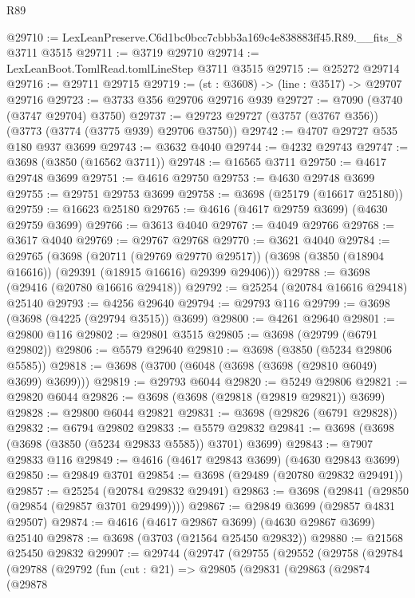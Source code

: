 \begin{lexlean}{R89}
\begin{coremodule}
@29710 := LexLeanPreserve.C6d1bc0bcc7cbbb3a169c4e838883ff45.R89.__fits_8 @3711 @3515
@29711 := @3719 @29710
@29714 := LexLeanBoot.TomlRead.tomlLineStep @3711 @3515
@29715 := @25272 @29714
@29716 := @29711 @29715
@29719 := (st : @3608) -> (line : @3517) -> @29707 @29716
@29723 := @3733 @356 @29706 @29716 @939
@29727 := @7090 (@3740 (@3747 @29704) @3750)
@29737 := @29723 @29727 (@3757 (@3767 @356)) (@3773 (@3774 (@3775 @939) @29706 @3750))
@29742 := @4707 @29727 @535 @180 @937 @3699
@29743 := @3632 @4040
@29744 := @4232 @29743
@29747 := @3698 (@3850 (@16562 @3711))
@29748 := @16565 @3711
@29750 := @4617 @29748 @3699
@29751 := @4616 @29750
@29753 := @4630 @29748 @3699
@29755 := @29751 @29753 @3699
@29758 := @3698 (@25179 (@16617 @25180))
@29759 := @16623 @25180
@29765 := @4616 (@4617 @29759 @3699) (@4630 @29759 @3699)
@29766 := @3613 @4040
@29767 := @4049 @29766
@29768 := @3617 @4040
@29769 := @29767 @29768
@29770 := @3621 @4040
@29784 := @29765
    (@3698
      (@20711 (@29769 @29770 @29517))
      (@3698 (@3850 (@18904 @16616)) (@29391 (@18915 @16616) @29399 @29406)))
@29788 := @3698 (@29416 (@20780 @16616 @29418))
@29792 := @25254 (@20784 @16616 @29418) @25140
@29793 := @4256 @29640
@29794 := @29793 @116
@29799 := @3698 (@3698 (@4225 (@29794 @3515)) @3699)
@29800 := @4261 @29640
@29801 := @29800 @116
@29802 := @29801 @3515
@29805 := @3698 (@29799 (@6791 @29802))
@29806 := @5579 @29640
@29810 := @3698 (@3850 (@5234 @29806 @5585))
@29818 := @3698 (@3700 (@6048 (@3698 (@3698 (@29810 @6049) @3699) @3699)))
@29819 := @29793 @6044
@29820 := @5249 @29806
@29821 := @29820 @6044
@29826 := @3698 (@3698 (@29818 (@29819 @29821)) @3699)
@29828 := @29800 @6044 @29821
@29831 := @3698 (@29826 (@6791 @29828))
@29832 := @6794 @29802
@29833 := @5579 @29832
@29841 := @3698 (@3698 (@3698 (@3850 (@5234 @29833 @5585)) @3701) @3699)
@29843 := @7907 @29833 @116
@29849 := @4616 (@4617 @29843 @3699) (@4630 @29843 @3699)
@29850 := @29849 @3701
@29854 := @3698 (@29489 (@20780 @29832 @29491))
@29857 := @25254 (@20784 @29832 @29491)
@29863 := @3698 (@29841 (@29850 (@29854 (@29857 @3701 @29499))))
@29867 := @29849 @3699 (@29857 @4831 @29507)
@29874 := @4616 (@4617 @29867 @3699) (@4630 @29867 @3699) @25140
@29878 := @3698 (@3703 (@21564 @25450 @29832))
@29880 := @21568 @25450 @29832
@29907 := @29744
    (@29747
      (@29755
        (@29552
          (@29758
            (@29784
              (@29788
                (@29792
                  (fun (cut : @21) =>
                  @29805
                    (@29831
                      (@29863
                        (@29874
                          (@29878

\end{coremodule}
\end{lexlean}
